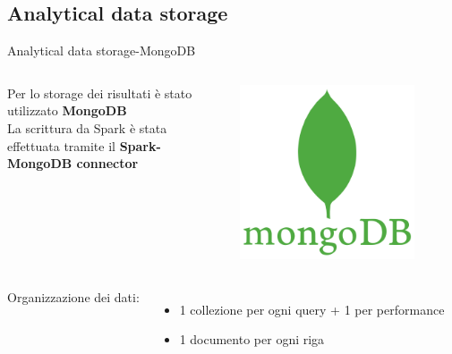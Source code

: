 \documentclass[13pt,aspectratio=169,t,xcolor=table]{beamer}
\begin{document}
\subsection{Analytical data storage}
\begin{frame}{Analytical data storage-MongoDB}
    \begin{columns}
    
            Per lo storage dei risultati è stato utilizzato \textbf{MongoDB} \\
            \vspace{0.2cm}
            La scrittura da Spark è stata effettuata tramite il \textbf{Spark-MongoDB connector}
        
            \begin{minipage}{0.5\textwidth}
                \raggedleft
                \includegraphics[width=0.8\textwidth]{res/mongodb_icon.png}
            \end{minipage}
    \end{columns}
    \vspace{0.5cm}
    \begin{columns}
            \begin{minipage}[b]{1\textwidth}
                Organizzazione dei dati:
                \begin{itemize}
                    \item 1 collezione per ogni query + 1 per performance
                    \item 1 documento per ogni riga

\end{itemize}
\end{minipage}
\end{columns}
\end{frame}
\end{document}
